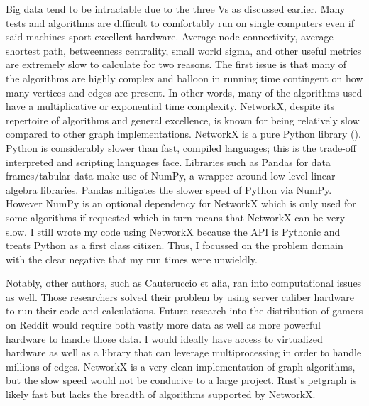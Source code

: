\documentclass[12pt, a4paper]{article}
\begin{document}
Big data tend to be intractable due to the three Vs as discussed earlier. Many tests and algorithms are difficult to comfortably run on single computers even if said machines sport excellent hardware. Average node connectivity, average shortest path, betweenness centrality, small world sigma, and other useful metrics are extremely slow to calculate for two reasons. The first issue is that many of the algorithms are highly complex and balloon in running time contingent on how many vertices and edges are present. In other words, many of the algorithms used have a multiplicative or exponential time complexity. NetworkX, despite its repertoire of algorithms and general excellence, is known for being relatively slow compared to other graph implementations. NetworkX is a pure Python library (\cite{networkx}). Python is considerably slower than fast, compiled languages; this is the trade-off interpreted and scripting languages face. Libraries such as Pandas for data frames/tabular data make use of NumPy, a wrapper around low level linear algebra libraries. Pandas mitigates the slower speed of Python via NumPy. However NumPy is an optional dependency for NetworkX which is only used for some algorithms if requested which in turn means that NetworkX can be very slow. I still wrote my code using NetworkX because the API is Pythonic and treats Python as a first class citizen. Thus, I focussed on the problem domain with the clear negative that my run times were unwieldly.

Notably, other authors, such as Cauteruccio et alia, ran into computational issues as well. Those researchers solved their problem by using server caliber hardware to run their code and calculations. Future research into the distribution of gamers on Reddit would require both vastly more data as well as more powerful hardware to handle those data. I would ideally have access to virtualized hardware as well as a library that can leverage multiprocessing in order to handle millions of edges. NetworkX is a very clean implementation of graph algorithms, but the slow speed would not be conducive to a large project. Rust's petgraph is likely fast but lacks the breadth of algorithms supported by NetworkX.
\end{document}
